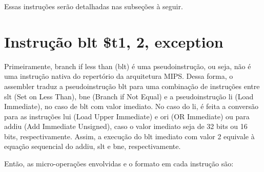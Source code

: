 \documentclass[
	12pt,				%
	oneside,			%
	a4paper,			%
	english,			%
	brazil				%
	]{abntex2ppgsi}
\begin{document}
Essas instruções serão detalhadas nas subseções à seguir.

\section{Instrução blt \$t1, 2, exception}
Primeiramente, branch if less than (blt) é uma pseudoinstrução, ou seja, não é uma instrução nativa do repertório da arquitetura MIPS. Dessa forma, o assembler traduz a pseudoinstrução blt para uma combinação de instruções entre slt (Set on Less Than), bne (Branch if Not Equal) e a pseudoinstrução li (Load Immediate), no caso de blt com valor imediato. No caso do li, é feita a conversão para as instruções lui (Load Upper Immediate) e ori (OR Immediate) ou para addiu (Add Immediate Unsigned), caso o valor imediato seja de 32 bits ou 16 bits, respectivamente. Assim, a execução do blt imediato com valor 2 equivale à equação sequencial do addiu, slt e bne, respectivamente.

Então, as micro-operações envolvidas e o formato em cada instrução são:
\end{document}

